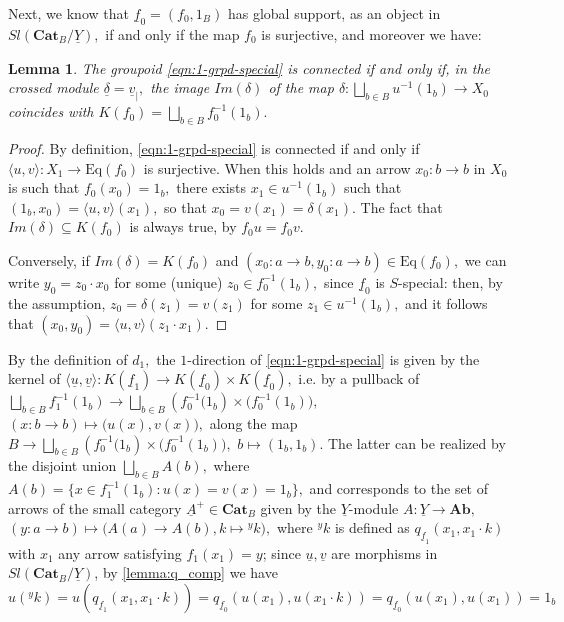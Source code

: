 \documentclass[11pt]{amsart}
\theoremstyle{plain}
\newtheorem{lemma}[subsubsection]{Lemma}
\theoremstyle{definition}
\theoremstyle{remark}
\newcommand{\la}{\langle}
\newcommand{\ra}{\rangle}
\newcommand{\un}{\underline}
\begin{document}
Next, we know that $\un{f}_0=(f_0,1_B)$ has global support, as an object in $Sl(\mathbf{Cat}_B/\un{Y}),$ if and only if the map $f_0$ is surjective, and moreover we have:
\begin{lemma}
The groupoid \eqref{eqn:1-grpd-special} is connected if and only if, in the crossed module $\un{\delta}=\un{v}_|,$ the image $Im(\delta)$ of the map $\delta\colon \bigsqcup_{b\in B}u^{-1}(1_b)\rightarrow X_0$ coincides with $K(f_0)=\bigsqcup_{b\in B}f_0^{-1}(1_b).$
\end{lemma}
\begin{proof}
By definition, \eqref{eqn:1-grpd-special} is connected if and only if $\la u,v\ra\colon X_1\rightarrow\mathrm{Eq}(f_0)$ is surjective. When this holds and an arrow $x_0\colon b\rightarrow b$ in $X_0$ is such that $f_0(x_0)=1_b,$ there exists $x_1\in u^{-1}(1_b)$ such that $(1_b,x_0)=\la u,v\ra(x_1),$ so that $x_0=v(x_1)=\delta(x_1).$ The fact that $Im(\delta)\subseteq K(f_0)$ is always true, by $f_0u=f_0v.$

Conversely, if $Im(\delta)=K(f_0)$ and $(x_0\colon a\rightarrow b,y_0\colon a\rightarrow b)\in\mathrm{Eq}(f_0),$ we can write $y_0=z_0\cdot x_0$ for some (unique) $z_0\in f_0^{-1}(1_b),$ since $\un{f}_0$ is $S$-special: then, by the assumption, $z_0=\delta(z_1)=v(z_1)$ for some $z_1\in u^{-1}(1_b),$ and it follows that $(x_0,y_0)=\la u,v\ra(z_1\cdot x_1).$
\end{proof}
By the definition of $d_1,$ the $1$-direction of \eqref{eqn:1-grpd-special} is given by the kernel of $\la\un{u},\un{v}\ra\colon K(\un{f}_1)\longrightarrow  K(\un{f}_0)\times K(\un{f}_0),$ i.e. by a pullback of $\bigsqcup_{b\in B} f_1^{-1}(1_b) \longrightarrow \bigsqcup_{b\in B}(f_0^{-1}\big(1_b)\times (f_0^{-1}(1_b)\big),$ $(x\colon b\rightarrow b)\mapsto\big(u(x),v(x)\big),$ along the map $B\longrightarrow \bigsqcup_{b\in B}(f_0^{-1}\big(1_b)\times (f_0^{-1}(1_b)\big),$ $b\mapsto(1_b,1_b).$ The latter can be realized by the disjoint union $\bigsqcup_{b\in B}A(b),$ where $A(b)=\{x\in f_1^{-1}(1_b):u(x)=v(x)=1_b\},$ and corresponds to the set of arrows of the small category $\un{A}^+\in\mathbf{Cat}_B$ given by the $\un{Y}$-module $A\colon \un{Y}\rightarrow\mathbf{Ab},$ $(y\colon a\rightarrow b)\longmapsto \big(A(a)\rightarrow A(b),k\mapsto {^yk}\big),$ where ${^yk}$ is defined as $q_{\un{f}_1}(x_1, x_1\cdot k)$ with $x_1$ any arrow satisfying $f_1(x_1)=y$; since $\un{u},\un{v}$ are morphisms in $Sl(\mathbf{Cat}_B/\underline{Y})$, by \ref{lemma:q_comp} we have
\begin{equation}
	\label{eqn:is_mod}
	u({^yk}) = u (q_{\un{f}_1}(x_1, x_1\cdot k)) = q_{\un{f}_0}(u(x_1), u(x_1\cdot k)) = q_{\un{f}_0}(u(x_1), u(x_1))=1_b
\end{equation}
\end{document}
